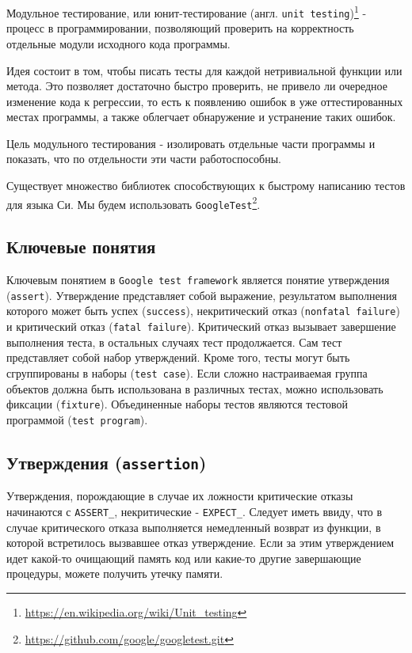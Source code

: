 \documentclass[12pt, twoside]{report}
\begin{document}
Модульное тестирование, или юнит-тестирование (англ. \texttt{unit testing})\footnote{\url{ https://en.wikipedia.org/wiki/Unit_testing}} - процесс в программировании, 
позволяющий проверить на корректность отдельные модули исходного кода программы.

Идея состоит в том, чтобы писать тесты для каждой нетривиальной функции или метода. Это позволяет достаточно быстро проверить, 
не привело ли очередное изменение кода к регрессии, то есть к появлению ошибок в уже оттестированных местах программы, а также облегчает обнаружение и 
устранение таких ошибок.

Цель модульного тестирования - изолировать отдельные части программы и показать, что по отдельности эти части работоспособны.


Существует множество библиотек способствующих к быстрому написанию тестов для языка Си. Мы будем использовать \texttt{GoogleTest}\footnote{\url{ https://github.com/google/googletest.git}}.


\subsection*{Ключевые понятия}

Ключевым понятием в \texttt{Google test framework} является понятие утверждения (\texttt{assert}). Утверждение представляет собой выражение, результатом выполнения 
которого может быть успех (\texttt{success}), некритический отказ (\texttt{nonfatal failure}) и критический отказ (\texttt{fatal failure}). Критический отказ вызывает 
завершение выполнения теста, в остальных случаях тест продолжается. Сам тест представляет собой набор утверждений. Кроме того, тесты могут быть сгруппированы в 
наборы (\texttt{test case}). Если сложно настраиваемая группа объектов должна быть использована в различных тестах, можно использовать фиксации 
(\texttt{fixture}). Объединенные наборы тестов являются тестовой программой (\texttt{test program}).

\subsection*{Утверждения (\texttt{assertion})}

Утверждения, порождающие в случае их ложности критические отказы начинаются с \texttt{ASSERT\_}, некритические - \texttt{EXPECT\_}. Следует иметь ввиду, что в случае 
критического отказа выполняется немедленный возврат из функции, в которой встретилось вызвавшее отказ утверждение. Если за этим утверждением идет какой-то 
очищающий память код или какие-то другие завершающие процедуры, можете получить утечку памяти.
\end{document}
